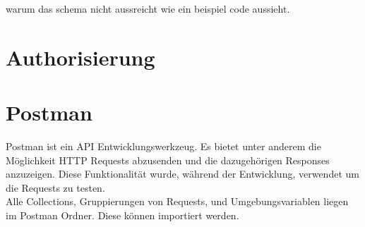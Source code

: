warum das schema nicht aussreicht
wie ein beispiel code aussieht.

\section{Authorisierung}

\section{Postman}
Postman ist ein API Entwicklungswerkzeug. Es bietet unter anderem die Möglichkeit HTTP Requests abzusenden und die dazugehörigen Responses anzuzeigen. Diese Funktionalität wurde, während der Entwicklung, verwendet um die Requests zu testen.\\
Alle Collections, Gruppierungen von Requests, und Umgebungsvariablen liegen im Postman Ordner. Diese können importiert werden.

